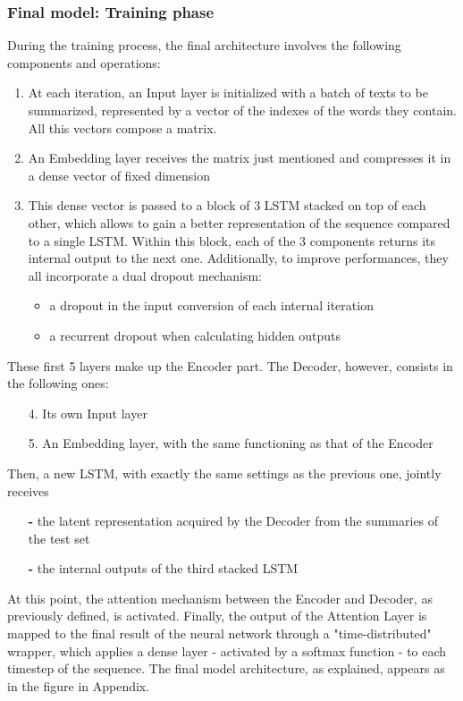 \documentclass[fleqn,10pt]{SelfArx} %
\begin{document}
\subsubsection{Final model: Training phase}
During the training process, the final architecture involves the following components and operations:
\begin{enumerate}
    \item At each iteration, an Input layer is initialized with a batch of texts to be summarized, represented by a vector of the indexes of the words they contain. All this vectors compose a matrix.
    \item An Embedding layer receives the matrix just mentioned and compresses it in a dense vector of fixed dimension
    \item This dense vector is passed to a block of 3 LSTM stacked on top of each other, which allows to gain a better representation of the sequence compared to a single LSTM. Within this block, each of the 3 components returns its internal output to the next one. Additionally, to improve performances, they all incorporate a dual dropout mechanism:
    \begin{itemize}
        \item a dropout in the input conversion of each internal iteration
        \item a recurrent dropout when calculating hidden outputs
    \end{itemize}
\end{enumerate}
These first 5 layers make up the Encoder part. The Decoder, however, consists in the following ones:
\begin{enumerate}
    \item[4.] Its own Input layer
    \item[5.] An Embedding layer, with the same functioning as that of the Encoder
\end{enumerate}
Then, a new LSTM, with exactly the same settings as the previous one, jointly receives
\begin{itemize}
    \item[\textbf{-}] the latent representation acquired by the Decoder from the summaries of the test set
    \item[\textbf{-}] the internal outputs of the third stacked LSTM
\end{itemize}
At this point, the attention mechanism between the Encoder and Decoder, as previously defined, is activated. Finally, the output of the Attention Layer is mapped to the final result of the neural network through a "time-distributed" wrapper, which applies a dense layer - activated by a softmax function - to each timestep of the sequence. The final model architecture, as explained, appears as in the figure in Appendix.\\
\end{document}
